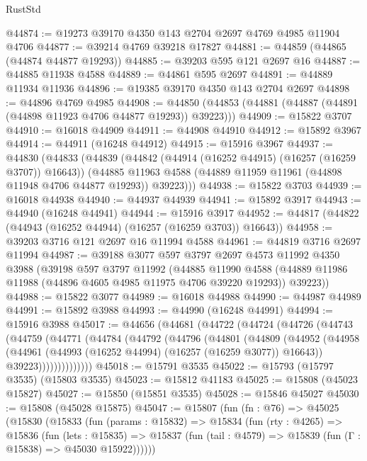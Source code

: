 \begin{lexlean}{RustStd}
\begin{coremodule}
@44874 := @19273 @39170 @4350 @143 @2704 @2697 @4769 @4985 @11904 @4706
@44877 := @39214 @4769 @39218 @17827
@44881 := @44859 (@44865 (@44874 @44877 @19293))
@44885 := @39203 @595 @121 @2697 @16
@44887 := @44885 @11938 @4588
@44889 := @44861 @595 @2697
@44891 := @44889 @11934 @11936
@44896 := @19385 @39170 @4350 @143 @2704 @2697
@44898 := @44896 @4769 @4985
@44908 := @44850 (@44853 (@44881 (@44887 (@44891 (@44898 @11923 @4706 @44877 @19293)) @39223)))
@44909 := @15822 @3707
@44910 := @16018 @44909
@44911 := @44908 @44910
@44912 := @15892 @3967
@44914 := @44911 (@16248 @44912)
@44915 := @15916 @3967
@44937 := @44830
    (@44833
      (@44839
        (@44842 (@44914 (@16252 @44915) (@16257 (@16259 @3707)) @16643))
        (@44885 @11963 @4588 (@44889 @11959 @11961 (@44898 @11948 @4706 @44877 @19293)) @39223)))
@44938 := @15822 @3703
@44939 := @16018 @44938
@44940 := @44937 @44939
@44941 := @15892 @3917
@44943 := @44940 (@16248 @44941)
@44944 := @15916 @3917
@44952 := @44817 (@44822 (@44943 (@16252 @44944) (@16257 (@16259 @3703)) @16643))
@44958 := @39203 @3716 @121 @2697 @16 @11994 @4588
@44961 := @44819 @3716 @2697 @11994
@44987 := @39188
    @3077
    @597
    @3797
    @2697
    @4573
    @11992
    @4350
    @3988
    (@39198
      @597
      @3797
      @11992
      (@44885
        @11990
        @4588
        (@44889 @11986 @11988 (@44896 @4605 @4985 @11975 @4706 @39220 @19293))
        @39223))
@44988 := @15822 @3077
@44989 := @16018 @44988
@44990 := @44987 @44989
@44991 := @15892 @3988
@44993 := @44990 (@16248 @44991)
@44994 := @15916 @3988
@45017 := @44656
    (@44681
      (@44722
        (@44724
          (@44726
            (@44743
              (@44759
                (@44771
                  (@44784
                    (@44792
                      (@44796
                        (@44801
                          (@44809
                            (@44952
                              (@44958
                                (@44961 (@44993 (@16252 @44994) (@16257 (@16259 @3077)) @16643))
                                @39223))))))))))))))
@45018 := @15791 @3535
@45022 := @15793 (@15797 @3535) (@15803 @3535)
@45023 := @15812 @41183
@45025 := @15808 (@45023 @15827)
@45027 := @15850 (@15851 @3535)
@45028 := @15846 @45027
@45030 := @15808 (@45028 @15875)
@45047 := @15807
    (fun (fn : @76) =>
    @45025
      (@15830
        (@15833
          (fun (params : @15832) =>
          @15834
            (fun (rty : @4265) =>
            @15836
              (fun (lets : @15835) =>
              @15837 (fun (tail : @4579) => @15839 (fun (Γ : @15838) => @45030 @15922))))))

\end{coremodule}
\end{lexlean}
